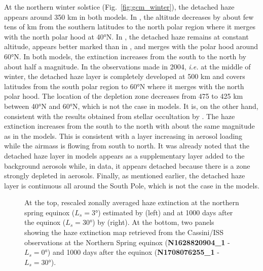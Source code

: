 At the northern winter solstice (Fig.~\ref{fig:gcm_winter}), the detached haze appears around 350 km
in both models. In \cite{Lebonnois2012}, the altitude decreases by about few tens of km from the southern latitudes to
the north polar region where it merges with the north polar hood at \ang{40}N. In \cite{Larson2015}, the detached
haze remains at constant altitude, appears better marked than in \cite{Lebonnois2012}, and merges with the polar hood
around \ang{60}N. In both models, the extinction increases from the south to the north by about half a magnitude.
In the observations made in 2004, \emph{i.e.} at the middle of winter, the detached haze layer is completely developed at
500 km and covers latitudes from the south polar region to \ang{60}N where it merges with the north polar hood. The
location of the depletion zone decreases from 475 to 425 km between \ang{40}N and \ang{60}N, which is not the case in
models. It is, on the other hand, consistent with the results obtained from stellar occultation by \cite{Sicardy2006}.
The haze extinction increases from the south to the north with about the same magnitude as in the models. This
is consistent with a layer increasing in aerosol loading while the airmass is flowing from south to north. It was already
noted \citep{West2011, West2018} that the detached haze layer in models appears as a supplementary layer added to
the background aerosols while, in data, it appears detached because there is a zone strongly depleted in
aerosols. Finally, as mentioned earlier, the detached haze layer is continuous all around the South Pole, which is not
the case in the models.

\begin{figure*}[!ht]
\caption{At the top, rescaled zonally averaged haze extinction at the northern spring equinox ($L_s = \ang{3}$)
estimated by \cite{Lebonnois2012} (left) and at 1000 days after the equinox ($L_s = \ang{30}$)
by \cite{Larson2015} (right).
At the bottom, two panels showing the haze extinction map retrieved from the Cassini/ISS observations
at the Northern Spring equinox (\textbf{N1628820904\_1} - $L_s = \ang{0}$) and 1000 days after the equinox
(\textbf{N1708076255\_1} - $L_s = \ang{30}$).}
\label{fig:gcm_spring}
\end{figure*}

